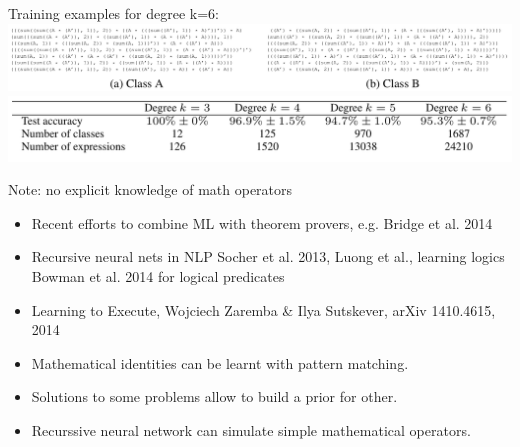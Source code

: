 \documentclass[landscape,a0b]{a0poster_csml_v2}
\begin{document}
\begin{poster}
\begin{PosterColumn}
Training examples for degree k=6:\\
\includegraphics[width=0.98\linewidth]{imgs/classes.png}
\includegraphics[width=0.98\linewidth]{imgs/print_trees.png}
\vspace{-0.6cm}
\begin{center}
Note: no explicit knowledge of math operators
\end{center}
\vspace{-0.6cm}
\vspace{-0.8cm}
\begin{itemize}
  \item Recent efforts to combine ML with theorem provers, e.g. Bridge et al. 2014
  \item Recursive neural nets in NLP Socher et al. 2013, Luong et al., learning logics Bowman et al. 2014 for logical predicates
  \item Learning to Execute, Wojciech Zaremba \& Ilya Sutskever, arXiv 1410.4615, 2014
\end{itemize}

\vspace{-1cm}
\begin{itemize}
  \item Mathematical identities can be learnt with pattern matching.
  \item Solutions to some problems allow to build a prior for other.
  \item Recurssive neural network can simulate simple mathematical operators.
\end{itemize}

\end{PosterColumn}
\end{poster}
\end{document}
